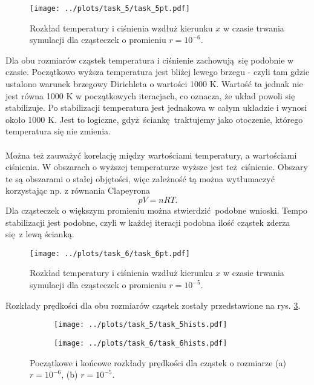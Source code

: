 \documentclass[a4paper, 12pt]{article}
\begin{document}
	\begin{figure}[H]
		\centering
		\texttt{[image: ../plots/task\_5/task\_5pt.pdf]}
		\caption{Rozkład temperatury i ciśnienia wzdłuż kierunku $x$ w czasie trwania symulacji dla cząsteczek o promieniu $r=10^{-6}$.}
		\label{pt_t5}
	\end{figure}

	\noindent Dla obu rozmiarów cząstek temperatura i ciśnienie zachowują się podobnie w czasie.
	Początkowo wyższa temperatura jest bliżej lewego brzegu - czyli tam gdzie ustalono warunek brzegowy Dirichleta o wartości 1000 K. 
	Wartość ta jednak nie jest równa 1000 K w początkowych iteracjach, co oznacza, że układ powoli się stabilizuje. 
	Po stabilizacji temperatura jest jednakowa w całym układzie i wynosi około 1000 K. 
	Jest to logiczne, gdyż ściankę traktujemy jako otoczenie, którego temperatura się nie zmienia. 
	\\
	\\
	Można też zauważyć korelację między wartościami temperatury, a wartościami ciśnienia.
	W obszarach o wyższej temperaturze wyższe jest też ciśnienie. 
	Obszary te są obszarami o stałej objętości, więc zależność tą można wytłumaczyć korzystając np. z równania Clapeyrona 
	\[ pV = nRT. \]
	Dla cząsteczek o większym promieniu można stwierdzić podobne wnioski.
	Tempo stabilizacji jest podobne, czyli w każdej iteracji podobna ilość cząstek zderza się z lewą ścianką. 
	
	\begin{figure}[H]
		\centering
		\texttt{[image: ../plots/task\_6/task\_6pt.pdf]}
		\caption{Rozkład temperatury i ciśnienia wzdłuż kierunku $x$ w czasie trwania symulacji dla cząsteczek o promieniu $r=10^{-5}$.}
		\label{pt_t6}
	\end{figure}
	
	\noindent Rozkłady prędkości dla obu rozmiarów cząstek zostały przedstawione na rys. \ref{hist_task_56}.
	\begin{figure}[H]
		\centering
		\begin{subfigure}{0.49\textwidth}
			\centering
			\texttt{[image: ../plots/task\_5/task\_5hists.pdf]}
			\caption{}
		\end{subfigure}
		\begin{subfigure}{0.49\textwidth}
			\centering
			\texttt{[image: ../plots/task\_6/task\_6hists.pdf]}
			\caption{}
		\end{subfigure}
		\caption{Początkowe i końcowe rozkłady prędkości dla cząstek o rozmiarze (a) $r = 10^{-6}$, (b) $r = 10^{-5}$.}
		\label{hist_task_56}
	\end{figure}
	
\end{document}
